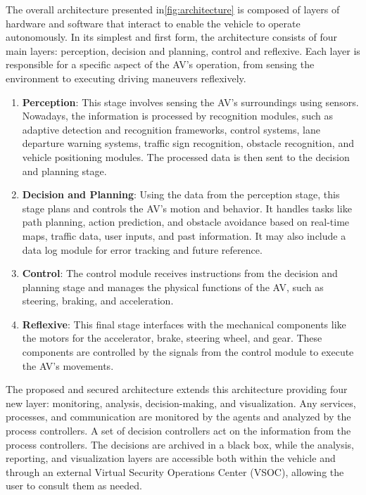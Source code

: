 The overall architecture presented in\ref{fig:architecture} is composed of layers of hardware and software that interact to enable the vehicle to operate autonomously.
In its simplest and first form, the architecture consists of four main layers: perception, decision and planning, control and reflexive.
Each layer is responsible for a specific aspect of the AV's operation, from sensing the environment to executing driving maneuvers reflexively\cite{architecture}.

\begin{enumerate}
    \item \textbf{Perception}: This stage involves sensing the AV's surroundings using sensors.
    Nowadays, the information is processed by recognition modules, such as adaptive detection and recognition frameworks, control systems, lane departure warning systems, traffic sign recognition, obstacle recognition, and vehicle positioning modules.
    The processed data is then sent to the decision and planning stage.
    \item \textbf{Decision and Planning}: Using the data from the perception stage, this stage plans and controls the AV's motion and behavior.
    It handles tasks like path planning, action prediction, and obstacle avoidance based on real-time maps, traffic data, user inputs, and past information.
    It may also include a data log module for error tracking and future reference.
    \item \textbf{Control}: The control module receives instructions from the decision and planning stage and manages the physical functions of the AV, such as steering, braking, and acceleration.
    \item \textbf{Reflexive}: This final stage interfaces with the mechanical components like the motors for the accelerator, brake, steering wheel, and gear.
    These components are controlled by the signals from the control module to execute the AV’s movements.
\end{enumerate}

The proposed and secured architecture extends this architecture providing four new layer: monitoring, analysis, decision-making, and visualization.
Any services, processes, and communication are monitored by the agents and analyzed by the process controllers.
A set of decision controllers act on the information from the process controllers.
The decisions are archived in a black box, while the analysis, reporting, and visualization layers are accessible both within the vehicle and through an external Virtual Security Operations Center (VSOC), allowing the user to consult them as needed\cite{adu-kyere2023self-aware}.

